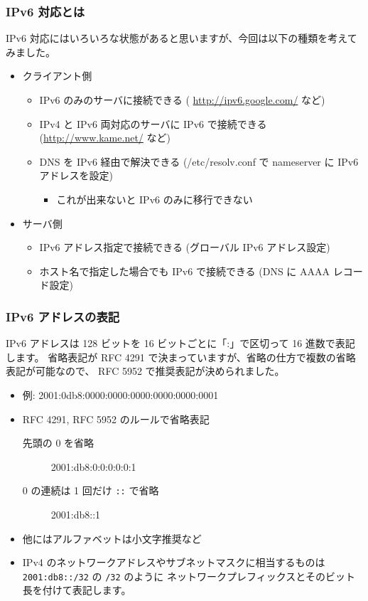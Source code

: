 \documentclass[mingoth,a4paper]{jsarticle}
\begin{document}
\subsubsection{IPv6 対応とは}

IPv6 対応にはいろいろな状態があると思いますが、今回は以下の種類を考えてみました。

\begin{itemize}
\item クライアント側

\begin{itemize}
\item IPv6 のみのサーバに接続できる ( \url{http://ipv6.google.com/} など)
\item IPv4 と IPv6 両対応のサーバに IPv6 で接続できる (\url{http://www.kame.net/} など)
\item DNS を IPv6 経由で解決できる (/etc/resolv.conf で nameserver に IPv6 アドレスを設定)

\begin{itemize}
\item これが出来ないと IPv6 のみに移行できない
\end{itemize}

\end{itemize}

\item サーバ側

\begin{itemize}
\item IPv6 アドレス指定で接続できる (グローバル IPv6 アドレス設定)
\item ホスト名で指定した場合でも IPv6 で接続できる (DNS に AAAA レコード設定)
\end{itemize}

\end{itemize}
\subsubsection{IPv6 アドレスの表記}

IPv6 アドレスは 128 ビットを 16 ビットごとに「:」で区切って 16 進数で表記します。
省略表記が RFC 4291 で決まっていますが、省略の仕方で複数の省略表記が可能なので、
RFC 5952 で推奨表記が決められました。

\begin{itemize}
\item 例: 2001:0db8:0000:0000:0000:0000:0000:0001
\item RFC 4291, RFC 5952 のルールで省略表記

\begin{description}
\item[先頭の 0 を省略] 2001:db8:0:0:0:0:0:1
\item[0 の連続は 1 回だけ \texttt{::} で省略] 2001:db8::1
\end{description}

\item 他にはアルファベットは小文字推奨など
\item IPv4 のネットワークアドレスやサブネットマスクに相当するものは
  \texttt{2001:db8::/32} の \texttt{/32} のように
  ネットワークプレフィックスとそのビット長を付けて表記します。
\end{itemize}
\end{document}
